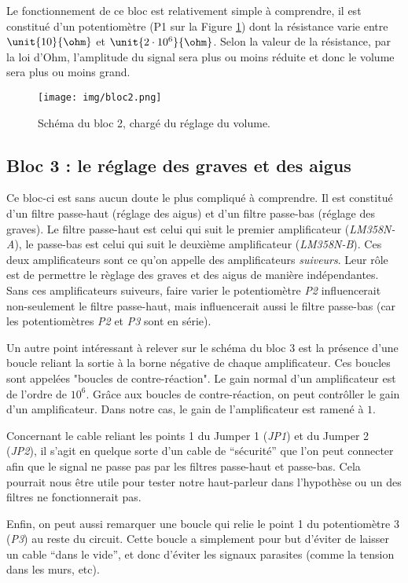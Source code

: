 \documentclass{article}
\begin{document}
Le fonctionnement de ce bloc est relativement simple à comprendre, il est constitué d'un potentiomètre (P1 sur la Figure \ref{bloc2}) dont la résistance varie entre $\unit{10}{\ohm}$ et $\unit{2 \cdot 10^{6}}{\ohm}$. Selon la valeur de la résistance, par la loi d'Ohm, l'amplitude du signal sera plus ou moins réduite et donc le volume sera plus ou moins grand.

\begin{figure}[h]
	\centering
	\texttt{[image: img/bloc2.png]}
	\caption{Schéma du bloc 2, chargé du réglage du volume.}
	\label{bloc2}
\end{figure}

\subsection{Bloc 3 : le réglage des graves et des aigus}

Ce bloc-ci est sans aucun doute le plus compliqué à comprendre. Il est constitué d'un filtre passe-haut (réglage des aigus) et d'un filtre passe-bas (réglage des graves). Le filtre passe-haut est celui qui suit le premier amplificateur (\textit{LM358N-A}), le passe-bas est celui qui suit le deuxième amplificateur (\textit{LM358N-B}). Ces deux amplificateurs sont ce qu'on appelle des amplificateurs \textit{suiveurs}. Leur rôle est de permettre le règlage des graves et des aigus de manière indépendantes. Sans ces amplificateurs suiveurs, faire varier le potentiomètre \textit{P2} influencerait non-seulement le filtre passe-haut, mais influencerait aussi le filtre passe-bas (car les potentiomètres \textit{P2} et \textit{P3} sont en série).

Un autre point intéressant à relever sur le schéma du bloc 3 est la présence d'une boucle reliant la sortie à la borne négative de chaque amplificateur. Ces boucles sont appelées "boucles de contre-réaction". Le gain normal d'un amplificateur est de l'ordre de $10^{6}$. Grâce aux boucles de contre-réaction, on peut contrôller le gain d'un amplificateur. Dans notre cas, le gain de l'amplificateur est ramené à $1$.

Concernant le cable reliant les points 1 du Jumper 1 (\textit{JP1}) et du Jumper 2 (\textit{JP2}), il s'agit en quelque sorte d'un cable de "`sécurité"' que l'on peut connecter afin que le signal ne passe pas par les filtres passe-haut et passe-bas. Cela pourrait nous être utile pour tester notre haut-parleur dans l'hypothèse ou un des filtres ne fonctionnerait pas.

Enfin, on peut aussi remarquer une boucle qui relie le point 1 du potentiomètre 3 (\textit{P3}) au reste du circuit. Cette boucle a simplement pour but d'éviter de laisser un cable "`dans le vide"', et donc d'éviter les signaux parasites (comme la tension dans les murs, etc).
\end{document}
